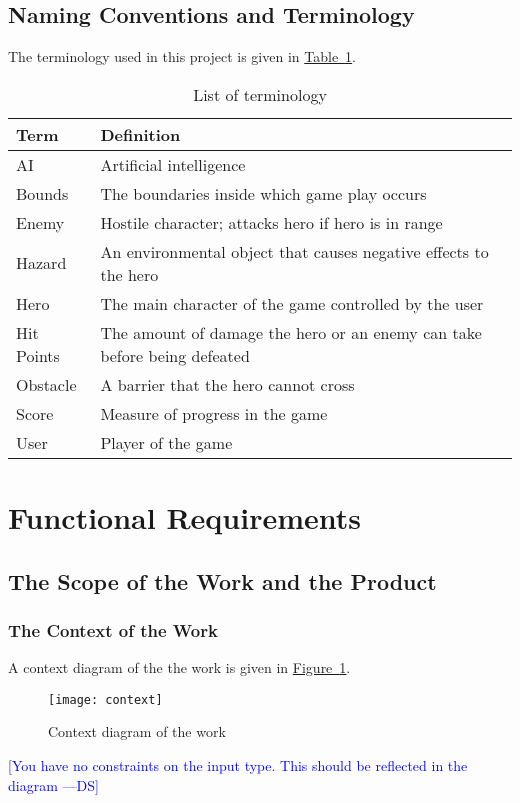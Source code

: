 \documentclass[12pt, titlepage]{article}
\newcommand{\authornote}[3]{\textcolor{#1}{[#3 ---#2]}}
\newcommand{\authornote}[3]{}
\newcommand{\ds}[1]{\authornote{blue}{DS}{#1}}
\begin{document}
\subsection{Naming Conventions and Terminology}
The terminology used in this project is given in \hyperref[tab:terminology]{Table~\ref*{tab:terminology}}.
\begin{table}[h]
\caption{List of terminology} \label{tab:terminology}
\begin{tabularx}{\textwidth}{p{3cm}X}
\toprule {\bf Term} & {\bf Definition}\\
\midrule
AI & Artificial intelligence\\
Bounds & The boundaries inside which game play occurs\\
Enemy & Hostile character; attacks hero if hero is in range\\
Hazard & An environmental object that causes negative effects to the hero\\
Hero & The main character of the game controlled by the user\\
Hit Points & The amount of damage the hero or an enemy can take before being defeated\\
Obstacle & A barrier that the hero cannot cross\\
Score & Measure of progress in the game\\
User & Player of the game\\
\bottomrule
\end{tabularx}
\end{table}

\newpage
\section{Functional Requirements}
\subsection{The Scope of the Work and the Product}

\subsubsection{The Context of the Work}
A context diagram of the the work is given in \hyperref[fig:context]{Figure~\ref*{fig:context}}.

\begin{figure}[hb]
\texttt{[image: context]}
\caption{Context diagram of the work} \label{fig:context}
\end{figure}
\ds{You have no constraints on the input type. This should be 
reflected in the diagram}
\end{document}
